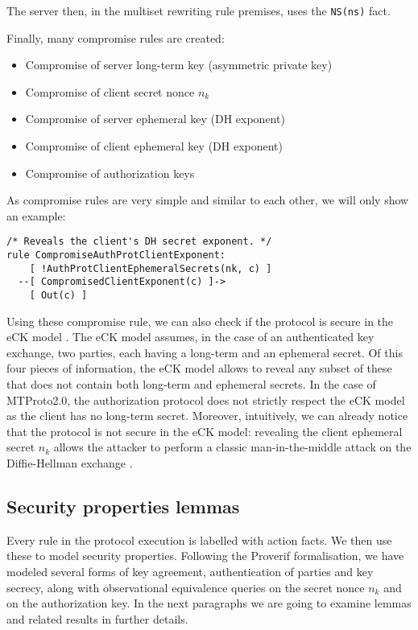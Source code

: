 The server then, in the multiset rewriting rule premises, uses the \lstinline{NS(ns)} fact.

Finally, many compromise rules are created:
\begin{itemize}
  \item Compromise of server long-term key (asymmetric private key)
  \item Compromise of client secret nonce $n_k$
  \item Compromise of server ephemeral key (DH exponent)
  \item Compromise of client ephemeral key (DH exponent)
  \item Compromise of authorization keys
\end{itemize}

As compromise rules are very simple and similar to each other, we will only show an example:

\begin{lstlisting}
/* Reveals the client's DH secret exponent. */
rule CompromiseAuthProtClientExponent:
    [ !AuthProtClientEphemeralSecrets(nk, c) ]
  --[ CompromisedClientExponent(c) ]->
    [ Out(c) ]
\end{lstlisting}

Using these compromise rule, we can also check if the protocol is secure in the eCK model \cite{eCK}. The eCK model assumes, in the case of an authenticated key exchange, two parties, each having a long-term and an ephemeral secret. Of this four pieces of information, the eCK model allows to reveal any subset of these that does not contain both long-term and ephemeral secrets.
In the case of MTProto2.0, the authorization protocol does not strictly respect the eCK model as the client has no long-term secret. Moreover, intuitively, we can already notice that the protocol is not secure in the eCK model: revealing the client ephemeral secret $n_k$ allows the attacker to perform a classic man-in-the-middle attack on the Diffie-Hellman exchange \cite{MITM-DH}.

\subsection{Security properties lemmas}
Every rule in the protocol execution is labelled with action facts. We then use these to model security properties. Following the Proverif formalisation, we have modeled several forms of key agreement, authentication of parties and key secrecy, along with observational equivalence queries on the secret nonce $n_k$ and on the authorization key. In the next paragraphs we are going to examine lemmas and related results in further details.

